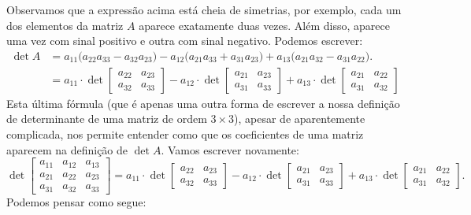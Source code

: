 Observamos que a expressão acima está cheia de simetrias, por exemplo, cada um dos elementos da matriz $A$ aparece exatamente duas vezes. Além disso, aparece uma vez com sinal positivo e outra com sinal negativo. Podemos escrever:
\begin{equation}
\begin{split}
\det A & = a_{11} \big( a_{22} a_{33} - a_{32} a_{23} \big) - a_{12} \big( a_{21} a_{33} + a_{31} a_{23} \big) + a_{13} \big( a_{21} a_{32} - a_{31} a_{22}\big). \\
       & = a_{11} \cdot \det \begin{bmatrix}
        a_{22} & a_{23} \\
        a_{32} & a_{33}
       \end{bmatrix} - a_{12} \cdot \det \begin{bmatrix}
       a_{21}  & a_{23} \\
       a_{31}  & a_{33}
       \end{bmatrix} +  a_{13} \cdot \det \begin{bmatrix}
       a_{21} & a_{22} \\
       a_{31} & a_{32}
       \end{bmatrix}
\end{split}
\end{equation}
Esta última fórmula (que é apenas uma outra forma de escrever a nossa definição de determinante de uma matriz de ordem $3 \times 3$), apesar de aparentemente complicada, nos permite entender como que os coeficientes de uma matriz aparecem na definição de $\det A$. Vamos escrever novamente:
\begin{equation}
\det \begin{bmatrix}
a_{11} & a_{12} & a_{13} \\
a_{21} & a_{22} & a_{23} \\
a_{31} & a_{32} & a_{33}
\end{bmatrix} = a_{11} \cdot \det \begin{bmatrix}
a_{22} & a_{23} \\
a_{32} & a_{33}
\end{bmatrix} - a_{12} \cdot \det \begin{bmatrix}
a_{21}  & a_{23} \\
a_{31}  & a_{33}
\end{bmatrix} +  a_{13} \cdot \det \begin{bmatrix}
a_{21} & a_{22} \\
a_{31} & a_{32}
\end{bmatrix}.
\end{equation} Podemos pensar como segue:
